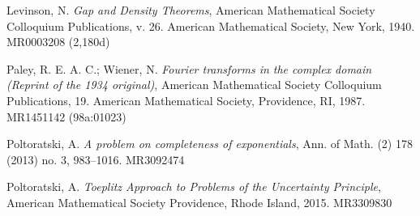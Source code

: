 \documentclass [11pt]{amsart}
\numberwithin{equation}{section}
\begin{document}
\begin{thebibliography}{99}
	 Levinson, N. \textit{Gap and Density Theorems}, American Mathematical Society Colloquium Publications, v. 26. American Mathematical Society, New York, 1940. MR0003208 (2,180d)
	
	
		
	
	 Paley, R. E. A. C.; Wiener, N. \textit{Fourier transforms in the complex domain (Reprint of the 1934 original)}, American Mathematical Society Colloquium Publications, 19. American Mathematical Society, Providence, RI, 1987. MR1451142 (98a:01023)
	
	
	 Poltoratski, A. \textit{A problem on completeness of exponentials}, Ann. of Math. (2) 178 (2013) no. 3, 983–1016. MR3092474
	
	 Poltoratski, A. \textit{Toeplitz Approach to Problems of the Uncertainty Principle}, American Mathematical Society Providence, Rhode Island, 2015. MR3309830
	
	
	
	
	
	


		
	
		
	
	
	
	
	
	
	
	
	
\end{thebibliography}
\end{document}
